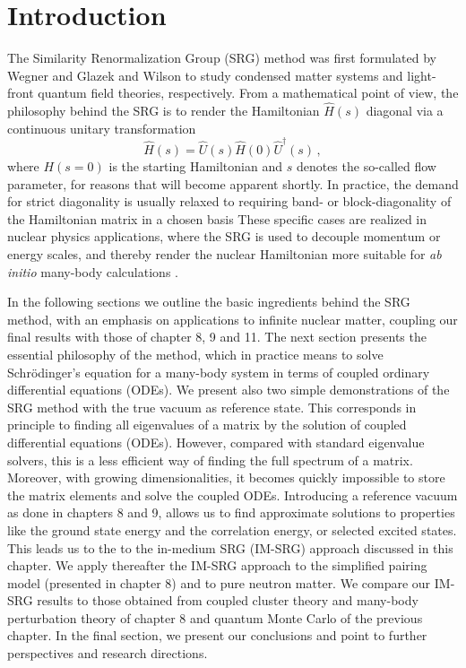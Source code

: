 \section{Introduction}

The Similarity Renormalization Group (SRG) method was first formulated by
Wegner \cite{Wegner:1994dk} and Glazek and Wilson \cite{Glazek:1993il}
to study condensed matter systems and light-front quantum field
theories, respectively.  From a mathematical point of view, the
philosophy behind the SRG is to render the Hamiltonian $\hat{H}(s)$
diagonal via a continuous unitary transformation
\begin{equation}\label{eq:cut}
  \hat{H}(s)=\hat{U}(s)\hat{H}(0)\hat{U}^{\dagger}(s)\,,
\end{equation}
where $H(s=0)$ is the starting Hamiltonian and $s$ denotes the so-called flow
parameter, for reasons that will become apparent shortly. In practice, the demand 
for strict diagonality is usually relaxed to requiring band- or block-diagonality 
of the Hamiltonian matrix in a chosen basis
These specific cases are realized in nuclear
physics applications, where the SRG is used to decouple momentum or
energy scales, and thereby render the nuclear Hamiltonian more
suitable for \emph{ab initio} many-body calculations \cite{Bogner:2007od,Bogner:2010pq,Morris:2015ve,Hergert:2016jk,Hergert:2016ng}.

In the following sections we outline the basic ingredients behind the
SRG method, with an emphasis on applications to infinite nuclear
matter, coupling our final results with those of chapter 8, 9 and
11. The next section presents the essential philosophy of the method,
which in practice means to solve Schr\"odinger's equation for a
many-body system in terms of coupled ordinary differential equations
(ODEs). We present also two simple demonstrations of the SRG method with the true vacuum as reference state. This corresponds in principle to finding all eigenvalues of a matrix by the solution of coupled differential equations (ODEs). 
However, compared with standard eigenvalue solvers, this is a less efficient way of finding the full spectrum of a matrix. 
Moreover, with growing dimensionalities, it becomes quickly impossible to store the matrix elements and solve the coupled ODEs. 
Introducing a reference vacuum as done in chapters 8 and 9, allows us to find approximate solutions to properties  like the  ground state energy and the correlation energy, or selected excited states. This leads us to the
to the in-medium SRG (IM-SRG) approach discussed in this chapter. 
We apply thereafter the IM-SRG approach to the simplified pairing  model (presented in chapter 8) and 
to pure neutron matter. We compare our IM-SRG results to those obtained from coupled cluster theory and many-body perturbation theory of  chapter 8 and quantum Monte Carlo of the previous chapter.  In the final section, we present our conclusions and point  to further
perspectives and research directions.

